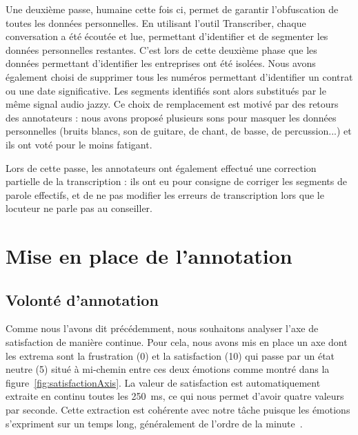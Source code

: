 Une deuxième passe, humaine cette fois ci, permet de garantir l'obfuscation de toutes les données personnelles. En utilisant l'outil Transcriber, chaque conversation a été écoutée et lue, permettant d'identifier et de segmenter les données personnelles restantes. C'est lors de cette deuxième phase que les données permettant d'identifier les entreprises ont été isolées. Nous avons également choisi de supprimer tous les numéros permettant d'identifier un contrat ou une date significative. Les segments identifiés sont alors substitués par le même signal audio jazzy. Ce choix de remplacement est motivé par des retours des annotateurs : nous avons proposé plusieurs sons pour masquer les données personnelles (bruits blancs, son de guitare, de chant, de basse, de percussion...) et ils ont voté pour le moins fatigant.

Lors de cette passe, les annotateurs ont également effectué une correction partielle de la transcription : ils ont eu pour consigne de corriger les segments de parole effectifs, et de ne pas modifier les erreurs de transcription lors que le locuteur ne parle pas au conseiller.

\section{Mise en place de l'annotation}

\subsection{Volonté d'annotation}
Comme nous l'avons dit précédemment, nous souhaitons analyser l'axe de satisfaction de manière continue. Pour cela, nous avons mis en place un axe dont les extrema sont la frustration (0) et la satisfaction (10) qui passe par un état neutre (5) situé à mi-chemin entre ces deux émotions comme montré dans la figure~\ref{fig:satisfactionAxis}. La valeur de satisfaction est automatiquement extraite en continu toutes les 250~ms, ce qui nous permet d'avoir quatre valeurs par seconde. Cette extraction est cohérente avec notre tâche puisque les émotions s'expriment sur un temps long, généralement de l'ordre de la minute~\cite{Schuller2010}.

